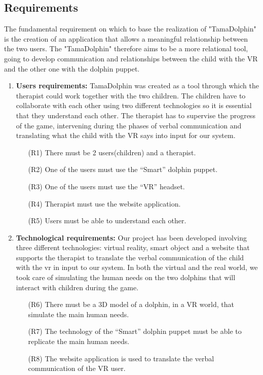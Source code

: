 \documentclass [12pt]{article}
\begin{document}
\subsection{Requirements}
The fundamental requirement on which to base the realization of "TamaDolphin" is the creation of an application that allows a meaningful relationship between the two users. The "TamaDolphin" therefore aims to be a more relational tool, going to develop communication and relationships between the child with the VR and the other one with the dolphin puppet. 
\begin{enumerate}
\item \textbf{Users requirements:}
TamaDolphin was created as a tool through which the therapist could work together with the two children. The children have to collaborate with each other using two different technologies so it is essential that they understand each other. The therapist has to supervise the progress of the game, intervening during the phases of verbal communication and translating what the child with the VR says into input for our system.
\begin{itemize}
\item [(R1)] There must be 2 users(children) and a therapist.
\item [(R2)] One of the users must use the “Smart” dolphin puppet.
\item [(R3)] One of the users must use the ``VR'' headset.
\item [(R4)] Therapist must use the website application. 
\item [(R5)] Users must be able to understand each other.

\end{itemize}
\item \textbf{Technological requirements:}
Our project has been developed involving three different technologies: virtual reality, smart object and a website that supports the therapist to translate the verbal communication of the child with the vr in input to our system. In both the virtual and the real world, we took care of simulating the human needs on the two dolphins that will interact with children during the game.
\begin{itemize}
\item [(R6)] There must be a 3D model of a dolphin, in a VR world, that simulate the main human needs.
\item [(R7)] The technology of the “Smart” dolphin puppet must be able to replicate the main human needs.
\item [(R8)] The website application is used to translate the verbal communication of the VR user.


\end{itemize}
\end{enumerate}
\end{document}
